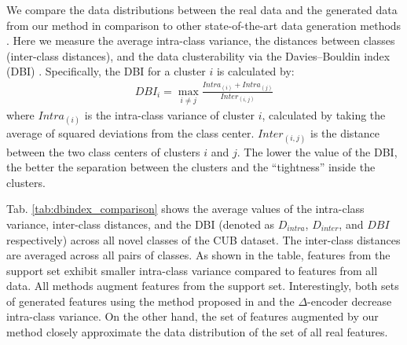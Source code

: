\documentclass[10pt,twocolumn,letterpaper]{article}
\begin{document}
We  compare the data distributions between the real data and the generated data from our method in comparison to other state-of-the-art data generation methods \cite{feature_transfer,delta-encoder}.  Here we measure the average intra-class variance, the distances between classes (inter-class distances), and the data clusterability via the Davies–Bouldin index (DBI) \cite{dbindex}.  
Specifically, the DBI for a cluster $i$ is calculated by:
\begin{equation} \label{DBI}
      \begin{split}
          DBI_{i} =  \max_{i \neq j}  \frac{Intra_{(i)} + Intra_{(j)}}{Inter_{(i,j)}}
      \end{split}
\end{equation}
where $Intra_{(i)}$ is the intra-class variance of cluster $i$, calculated by taking the average of squared deviations from the class center.
$Inter_{(i,j)}$ is the distance between the two class centers of clusters $i$ and $j$.
The lower the value of the DBI, the better the separation between the clusters and the ``tightness'' inside the clusters.


Tab. \ref{tab:dbindex_comparison} shows the average values of the intra-class variance, inter-class distances,  and the DBI (denoted as $D_{intra}$, $D_{inter}$, and $DBI$ respectively) across all novel classes of the CUB dataset. The inter-class distances are averaged across all pairs of classes.
As shown in the table, features from the support set exhibit smaller intra-class variance compared to features from all data. All methods augment features from the support set. 
Interestingly, both  sets of generated features using the method proposed in \cite{feature_transfer} and the $\Delta$-encoder\cite{delta-encoder} decrease intra-class variance. On the other hand, the set of features augmented by our method closely approximate the data distribution of the set of all real features.
\end{document}
